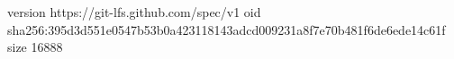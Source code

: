 version https://git-lfs.github.com/spec/v1
oid sha256:395d3d551e0547b53b0a423118143adcd009231a8f7e70b481f6de6ede14c61f
size 16888
